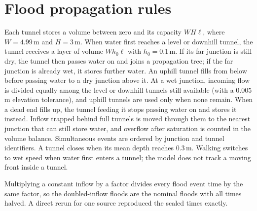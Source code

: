 \section{Flood propagation rules}\label{app:flood}
Each tunnel stores a volume between zero and its capacity $WH\ell$, where $W=4.99$\,m and $H=3$\,m. When water first reaches a level or downhill tunnel, the tunnel receives a layer of volume $Wh_0\ell$ with $h_0=0.1$\,m. If its far junction is still dry, the tunnel then passes water on and joins a propagation tree; if the far junction is already wet, it stores further water. An uphill tunnel fills from below before passing water to a dry junction above it. At a wet junction, incoming flow is divided equally among the level or downhill tunnels still available (with a 0.005\,m elevation tolerance), and uphill tunnels are used only when none remain. When a dead end fills up, the tunnel feeding it stops passing water on and stores it instead. Inflow trapped behind full tunnels is moved through them to the nearest junction that can still store water, and overflow after saturation is counted in the volume balance. Simultaneous events are ordered by junction and tunnel identifiers. A tunnel closes when its mean depth reaches 0.3\,m. Walking switches to wet speed when water first enters a tunnel; the model does not track a moving front inside a tunnel.

Multiplying a constant inflow by a factor divides every flood event time by the same factor, so the doubled-inflow floods are the nominal floods with all times halved. A direct rerun for one source reproduced the scaled times exactly.
